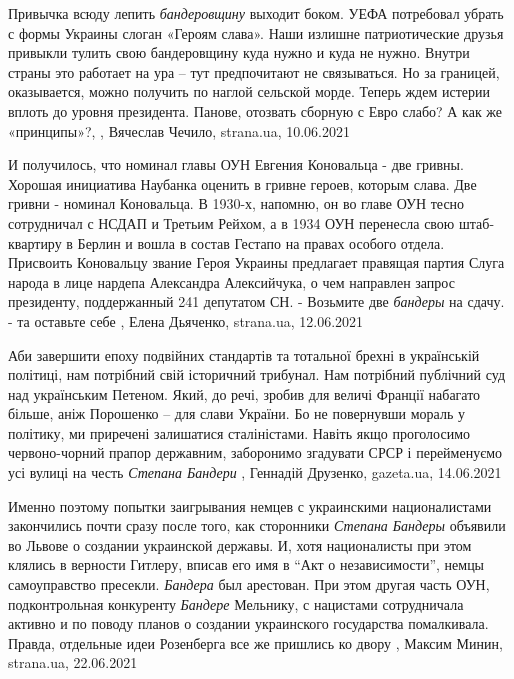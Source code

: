 Привычка всюду лепить \emph{бандеровщину} выходит боком.  УЕФА потребовал
убрать с формы Украины слоган «Героям слава».  Наши излишне патриотические
друзья привыкли тулить свою бандеровщину куда нужно и куда не нужно. Внутри
страны это работает на ура – тут предпочитают не связываться. Но за границей,
оказывается, можно получить по наглой сельской морде. Теперь ждем истерии
вплоть до уровня президента.  Панове, отозвать сборную с Евро слабо? А как же
«принципы»?,
, 
Вячеслав Чечило, strana.ua, 10.06.2021

И получилось, что номинал главы ОУН Евгения Коновальца - две гривны.  Хорошая
инициатива Наубанка оценить в гривне героев, которым слава. Две гривни -
номинал Коновальца. В 1930-х, напомню, он во главе ОУН тесно сотрудничал с
НСДАП и Третьим Рейхом, а в 1934 ОУН перенесла свою штаб-квартиру в Берлин и
вошла в состав Гестапо на правах особого отдела. Присвоить Коновальцу звание
Героя Украины предлагает правящая партия Слуга народа в лице нардепа Александра
Алексийчука, о чем направлен запрос президенту, поддержанный 241 депутатом СН.
- Возьмите две \emph{бандеры} на сдачу. - та оставьте себе
, 
Елена Дьяченко, strana.ua, 12.06.2021

Аби завершити епоху подвійних стандартів та тотальної брехні в українській
політиці, нам потрібний свій історичний трибунал. Нам потрібний публічний суд
над українським Петеном. Який, до речі, зробив для величі Франції набагато
більше, аніж Порошенко – для слави України.  Бо не повернувши мораль у
політику, ми приречені залишатися сталіністами. Навіть якщо проголосимо
червоно-чорний прапор державним, заборонимо згадувати СРСР і перейменуємо усі
вулиці на честь \emph{Степана Бандери}
, 
Геннадій Друзенко, gazeta.ua, 14.06.2021

Именно поэтому попытки заигрывания немцев с украинскими националистами
закончились почти сразу после того, как сторонники \emph{Степана Бандеры} объявили во
Львове о создании украинской державы. И, хотя националисты при этом клялись в
верности Гитлеру, вписав его имя в \enquote{Акт о независимости}, немцы самоуправство
пресекли. \emph{Бандера} был арестован.  При этом другая часть ОУН, подконтрольная
конкуренту \emph{Бандере} Мельнику, с нацистами сотрудничала активно и по поводу
планов о создании украинского государства помалкивала.  Правда, отдельные идеи
Розенберга все же пришлись ко двору
  , Максим Минин, strana.ua, 22.06.2021

